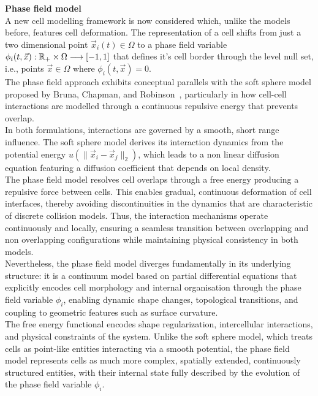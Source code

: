 \textbf{Phase field model} \\
A new cell modelling framework is now considered which, unlike the models before, features cell deformation. 
The representation of a cell shifts from just a two dimensional point $\vec{x}_i(t) \in \Omega$ to a phase field variable $\phi_i(t, \vec{x}): \mathbb{R}_+ \times \Omega \longrightarrow [-1,1]$ that defines it's cell border through the level null set, i.e., points $\vec{x} \in \Omega$ where $\phi_i(t, \vec{x}) = 0$. \\
The phase field approach exhibits conceptual parallels with the soft sphere model proposed by Bruna, Chapman, and Robinson~\cite{Bruna2017}, particularly in how cell-cell interactions are modelled through a continuous repulsive energy that prevents overlap. \\
In both formulations, interactions are governed by a smooth, short range influence. 
The soft sphere model derives its interaction dynamics from the potential energy $u(\|\vec{x}_i - \vec{x}_j\|_2)$, which leads to a non linear diffusion equation featuring a diffusion coefficient that depends on local density. \\
The phase field model resolves cell overlaps through a free energy producing a repulsive force between cells. 
This enables gradual, continuous deformation of cell interfaces, thereby avoiding discontinuities in the dynamics that are characteristic of discrete collision models. 
Thus, the interaction mechanisms operate continuously and locally, ensuring a seamless transition between overlapping and non overlapping configurations while maintaining physical consistency in both models. \\
Nevertheless, the phase field model diverges fundamentally in its underlying structure: it is a continuum model based on partial differential equations that explicitly encodes cell morphology and internal organisation through the phase field variable $\phi_i$, enabling dynamic shape changes, topological transitions, and coupling to geometric features such as surface curvature. \\
The free energy functional encodes shape regularization, intercellular interactions, and physical constraints of the system. 
Unlike the soft sphere model, which treats cells as point-like entities interacting via a smooth potential, the phase field model represents cells as much more complex, spatially extended, continuously structured entities, with their internal state fully described by the evolution of the phase field variable $\phi_i$. 

